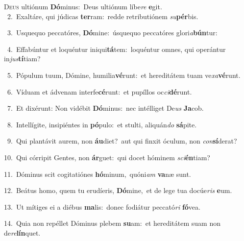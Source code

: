 \lettrine{\initial\textcolor{\initialcolor}{D}}{eus} ultiónum \textbf{Dó}\-minus:~\star Deus ultiónum líbe\textit{re} \textbf{e}\-git.\\
{\numbfont\textcolor{\numbcolor}{~2.}}~Exaltáre, qui júdicas \textbf{ter}\-ram:~\star redde retributiónem \textit{su}\-\textbf{pér}bis.\par
{\numbfont\textcolor{\numbcolor}{~3.}}~Usquequo peccatóres, \textbf{Dó}\-mine:~\star úsquequo peccatóres glori\-\textit{a}\-\textbf{bún}tur:\par
{\numbfont\textcolor{\numbcolor}{~4.}}~Effabúntur et loquéntur iniqui\-\textbf{tá}\-tem:~\star loquéntur omnes, qui operántur in\-\textit{jus}\-\textbf{tí}tiam?\par
{\numbfont\textcolor{\numbcolor}{~5.}}~Pópulum tuum, Dómine, humilia\-\textbf{vé}\-runt:~\star et hereditátem tuam ve\-\textit{xa}\-\textbf{vé}runt.\par
{\numbfont\textcolor{\numbcolor}{~6.}}~Víduam et ádvenam interfe\-\textbf{cé}\-runt:~\star et pupíllos oc\-\textit{ci}\-\textbf{dé}runt.\par
{\numbfont\textcolor{\numbcolor}{~7.}}~Et dixérunt: Non vidébit \textbf{Dó}\-minus:~\star nec intélliget De\textit{us} \textbf{Ja}\-cob.\par
{\numbfont\textcolor{\numbcolor}{~8.}}~Intellígite, insipiéntes in \textbf{pó}\-pulo:~\star et stulti, aliquán\textit{do} \textbf{sá}\-pite.\par
{\numbfont\textcolor{\numbcolor}{~9.}}~Qui plantávit aurem, non \textbf{áu}\-diet?~\star aut qui finxit óculum, non \textit{con}\-\textbf{sí}derat?\par
{\numbfont\textcolor{\numbcolor}{10.}}~Qui córripit Gentes, non \textbf{ár}\-guet:~\star qui docet hóminem \textit{sci}\-\textbf{én}tiam?\par
{\numbfont\textcolor{\numbcolor}{11.}}~Dóminus scit cogitatiónes \textbf{hó}\-minum,~\star quóni\textit{am} \textbf{va}\-næ sunt.\par
{\numbfont\textcolor{\numbcolor}{12.}}~Beátus homo, quem tu erudíeris, \textbf{Dó}\-mine,~\star et de lege tua docúe\textit{ris} \textbf{e}\-um.\par
{\numbfont\textcolor{\numbcolor}{13.}}~Ut mítiges ei a diébus \textbf{ma}\-lis:~\star donec fodiátur peccató\textit{ri} \textbf{fó}\-vea.\par
{\numbfont\textcolor{\numbcolor}{14.}}~Quia non repéllet Dóminus plebem \textbf{su}\-am:~\star et hereditátem suam non de\-\textit{re}\-\textbf{lín}quet.\par
